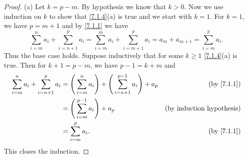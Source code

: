 \begin{proof}{(a)}
  Let \(k = p - m\).
  By hypothesis we know that \(k > 0\).
  Now we use induction on \(k\) to show that \cref{7.1.4}(a) is true and we start with \(k = 1\).
  For \(k = 1\), we have \(p = m + 1\) and by \cref{7.1.1} we have
  \[
    \sum_{i = m}^n a_i + \sum_{i = n + 1}^p a_i = \sum_{i = m}^m a_i + \sum_{i = m + 1}^p a_i = a_m + a_{m + 1} = \sum_{i = m}^p a_i.
  \]
  Thus the base case holds.
  Suppose inductively that for some \(k \geq 1\) \cref{7.1.4}(a) is true.
  Then for \(k + 1 = p - m\), we have \(p - 1 = k + m\) and
  \begin{align*}
    \sum_{i = m}^n a_i + \sum_{i = n + 1}^p a_i & = \Bigg(\sum_{i = m}^n a_i\Bigg) + \Bigg(\sum_{i = n + 1}^{p - 1} a_i\Bigg) + a_p & \text{(by \cref{7.1.1})}         \\
                                                & = \Bigg(\sum_{i = m}^{p - 1} a_i\Bigg) + a_p                                      & \text{(by induction hypothesis)} \\
                                                & = \sum_{i = m}^p a_i.                                                             & \text{(by \cref{7.1.1})}
  \end{align*}
  This closes the induction.
\end{proof}

